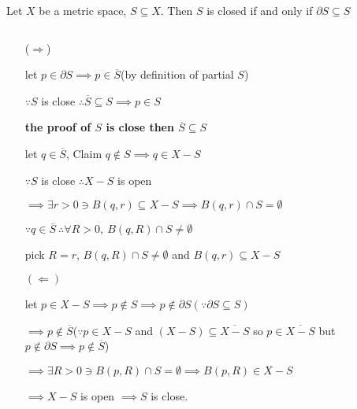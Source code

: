 Let $X$ be a metric space, $S \subseteq X$. Then $S$ is closed if and only if $ \partial S \subseteq S$


\begin{tcolorbox}
	\begin{solution}$ $
		\begin{enumerate}
			\item[($\Rightarrow$)]
			
			let $p \in \partial S \implies p \in \overline S$(by definition of partial $S$)
			
			$\because S$ is close $\therefore \overline{S} \subseteq S \implies p \in S$
			
			\textbf{the proof of $S$ is close then $\overline{S} \subseteq S$}
			
			let $q \in \overline{S}$, Claim $q \notin S \implies q \in X - S$
			
			$\because S$ is close $\therefore X-S$ is open
			
			$\implies \exists r > 0 \ni B(q,r) \subseteq X-S \implies B(q,r) \cap S = \emptyset$
			
			$\because q \in \overline{S} ~ \therefore \forall R > 0, ~ B(q,R) \cap S \neq \emptyset$
			
			pick $R = r$, $B(q,R) \cap S \neq \emptyset$ and $B(q,r) \subseteq X-S$
			\item[$(\Leftarrow)$]
			
			let $p \in X-S \implies p \notin S \implies p \notin \partial S (\because \partial S \subseteq S)$
			
			$\implies p \notin \overline{S}$($\because p \in X-S$ and $(X-S) \subseteq \overline{X-S}$ so $p \in \overline{X - S}$ but $p \notin \partial S \implies p \notin \overline{S}$)
			
			$\implies \exists R>0 \ni B(p,R) \cap S = \emptyset \implies B(p,R) \in X-S$
			
			$\implies X - S$ is open $\implies S$ is close.
		\end{enumerate}
	\end{solution}
\end{tcolorbox}
